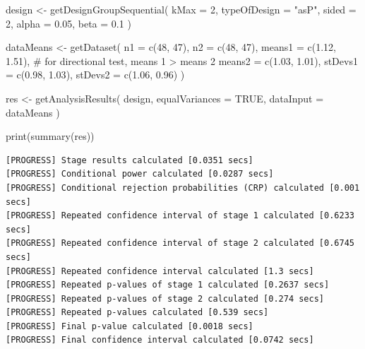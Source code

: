 \documentclass[
  letterpaper,
  DIV=11,
  numbers=noendperiod]{scrreprt}
\newenvironment{Shaded}{\begin{snugshade}}{\end{snugshade}}
\newcommand{\AttributeTok}[1]{\textcolor[rgb]{0.40,0.45,0.13}{#1}}
\newcommand{\CommentTok}[1]{\textcolor[rgb]{0.37,0.37,0.37}{#1}}
\newcommand{\ConstantTok}[1]{\textcolor[rgb]{0.56,0.35,0.01}{#1}}
\newcommand{\DecValTok}[1]{\textcolor[rgb]{0.68,0.00,0.00}{#1}}
\newcommand{\FloatTok}[1]{\textcolor[rgb]{0.68,0.00,0.00}{#1}}
\newcommand{\FunctionTok}[1]{\textcolor[rgb]{0.28,0.35,0.67}{#1}}
\newcommand{\NormalTok}[1]{\textcolor[rgb]{0.00,0.23,0.31}{#1}}
\newcommand{\OtherTok}[1]{\textcolor[rgb]{0.00,0.23,0.31}{#1}}
\newcommand{\StringTok}[1]{\textcolor[rgb]{0.13,0.47,0.30}{#1}}
\begin{document}
\begin{Shaded}
\begin{Highlighting}[]
\NormalTok{design }\OtherTok{\textless{}{-}} \FunctionTok{getDesignGroupSequential}\NormalTok{(}
  \AttributeTok{kMax =} \DecValTok{2}\NormalTok{,}
  \AttributeTok{typeOfDesign =} \StringTok{"asP"}\NormalTok{,}
  \AttributeTok{sided =} \DecValTok{2}\NormalTok{,}
  \AttributeTok{alpha =} \FloatTok{0.05}\NormalTok{,}
  \AttributeTok{beta =} \FloatTok{0.1}
\NormalTok{)}

\NormalTok{dataMeans }\OtherTok{\textless{}{-}} \FunctionTok{getDataset}\NormalTok{(}
  \AttributeTok{n1 =} \FunctionTok{c}\NormalTok{(}\DecValTok{48}\NormalTok{, }\DecValTok{47}\NormalTok{), }
  \AttributeTok{n2 =} \FunctionTok{c}\NormalTok{(}\DecValTok{48}\NormalTok{, }\DecValTok{47}\NormalTok{), }
  \AttributeTok{means1 =} \FunctionTok{c}\NormalTok{(}\FloatTok{1.12}\NormalTok{, }\FloatTok{1.51}\NormalTok{), }\CommentTok{\# for directional test, means 1 \textgreater{} means 2}
  \AttributeTok{means2 =} \FunctionTok{c}\NormalTok{(}\FloatTok{1.03}\NormalTok{, }\FloatTok{1.01}\NormalTok{),}
  \AttributeTok{stDevs1 =} \FunctionTok{c}\NormalTok{(}\FloatTok{0.98}\NormalTok{, }\FloatTok{1.03}\NormalTok{), }
  \AttributeTok{stDevs2 =} \FunctionTok{c}\NormalTok{(}\FloatTok{1.06}\NormalTok{, }\FloatTok{0.96}\NormalTok{)}
\NormalTok{  )}

\NormalTok{res }\OtherTok{\textless{}{-}} \FunctionTok{getAnalysisResults}\NormalTok{(}
\NormalTok{  design, }
  \AttributeTok{equalVariances =} \ConstantTok{TRUE}\NormalTok{,}
  \AttributeTok{dataInput =}\NormalTok{ dataMeans}
\NormalTok{  )}

\FunctionTok{print}\NormalTok{(}\FunctionTok{summary}\NormalTok{(res))}
\end{Highlighting}
\end{Shaded}

\begin{verbatim}
[PROGRESS] Stage results calculated [0.0351 secs] 
[PROGRESS] Conditional power calculated [0.0287 secs] 
[PROGRESS] Conditional rejection probabilities (CRP) calculated [0.001 secs] 
[PROGRESS] Repeated confidence interval of stage 1 calculated [0.6233 secs] 
[PROGRESS] Repeated confidence interval of stage 2 calculated [0.6745 secs] 
[PROGRESS] Repeated confidence interval calculated [1.3 secs] 
[PROGRESS] Repeated p-values of stage 1 calculated [0.2637 secs] 
[PROGRESS] Repeated p-values of stage 2 calculated [0.274 secs] 
[PROGRESS] Repeated p-values calculated [0.539 secs] 
[PROGRESS] Final p-value calculated [0.0018 secs] 
[PROGRESS] Final confidence interval calculated [0.0742 secs] 
\end{verbatim}
\end{document}
